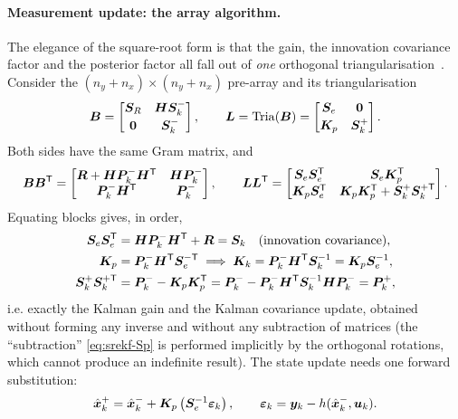 \paragraph{Measurement update: the array algorithm.} The elegance of the square-root form is
that the gain, the innovation covariance factor and the posterior factor all fall out of
\emph{one} orthogonal triangularisation~\cite[Ch.~12]{kailath2000}. Consider the
$(n_y+n_x)\times(n_y+n_x)$ pre-array and its triangularisation
\begin{equation}
\bm{B} = \begin{bmatrix} \bm{S}_R & \bm{H}\bm{S}^-_k \\[2pt] \bm{0} & \bm{S}^-_k \end{bmatrix},
\qquad
\bm{L} = \operatorname{Tria}(\bm{B}) = \begin{bmatrix} \bm{S}_e & \bm{0} \\[2pt] \bm{K}_p & \bm{S}^+_k \end{bmatrix}.
\label{eq:srekf-array}
\end{equation}
Both sides have the same Gram matrix, and
\begin{equation}
\bm{B}\bm{B}^{\mathsf{T}} = \begin{bmatrix}
\bm{R} + \bm{H}\bm{P}^{-}_k\bm{H}^{\mathsf{T}} & \bm{H}\bm{P}^{-}_k \\
\bm{P}^{-}_k\bm{H}^{\mathsf{T}} & \bm{P}^{-}_k \end{bmatrix},
\qquad
\bm{L}\bm{L}^{\mathsf{T}} = \begin{bmatrix}
\bm{S}_e\bm{S}_e^{\mathsf{T}} & \bm{S}_e\bm{K}_p^{\mathsf{T}} \\
\bm{K}_p\bm{S}_e^{\mathsf{T}} & \bm{K}_p\bm{K}_p^{\mathsf{T}} + \bm{S}^+_k\bm{S}^{+\mathsf{T}}_k \end{bmatrix}.
\label{eq:srekf-gram}
\end{equation}
Equating blocks gives, in order,
\begin{align}
\bm{S}_e\bm{S}_e^{\mathsf{T}} &= \bm{H}\bm{P}^{-}_k\bm{H}^{\mathsf{T}} + \bm{R} = \bm{S}_k \quad \text{(innovation covariance)},
\label{eq:srekf-Se}\\
\bm{K}_p &= \bm{P}^{-}_k\bm{H}^{\mathsf{T}}\bm{S}_e^{-\mathsf{T}} \;\Longrightarrow\;
 \bm{K}_k = \bm{P}^{-}_k\bm{H}^{\mathsf{T}}\bm{S}_k^{-1} = \bm{K}_p\bm{S}_e^{-1},
\label{eq:srekf-Kp}\\
\bm{S}^+_k\bm{S}^{+\mathsf{T}}_k &= \bm{P}^{-}_k - \bm{K}_p\bm{K}_p^{\mathsf{T}}
 = \bm{P}^{-}_k - \bm{P}^{-}_k\bm{H}^{\mathsf{T}}\bm{S}_k^{-1}\bm{H}\bm{P}^{-}_k = \bm{P}^{+}_k,
\label{eq:srekf-Sp}
\end{align}
i.e. exactly the Kalman gain and the Kalman covariance update, obtained without forming any
inverse and without any subtraction of matrices (the ``subtraction'' \eqref{eq:srekf-Sp} is
performed implicitly by the orthogonal rotations, which cannot produce an indefinite result).
The state update needs one forward substitution:
\begin{equation}
\hat{\bm{x}}^{+}_k = \hat{\bm{x}}^{-}_k + \bm{K}_p\left(\bm{S}_e^{-1}\bm{\bm{\varepsilon}}_k\right), \qquad
\bm{\bm{\varepsilon}}_k = \bm{y}_k - h(\hat{\bm{x}}^{-}_k,\bm{u}_k).
\label{eq:srekf-state}
\end{equation}

